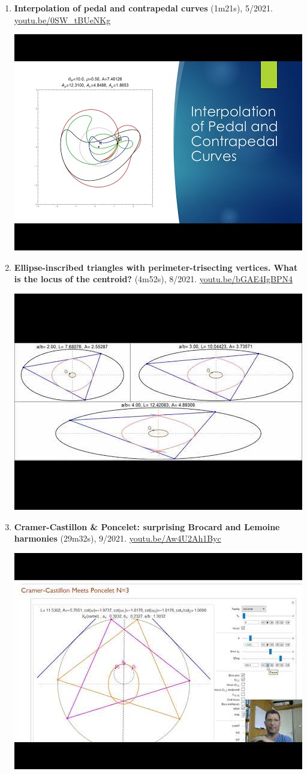 \documentclass[12pt]{article}
\begin{document}
\begin{enumerate}[resume]
% 
\item \textbf{Interpolation of pedal and contrapedal curves} (1m21s), 5/2021. \href{https://youtu.be/0SW_tBUeNKg}{\url{youtu.be/0SW\_tBUeNKg}}
\begin{center}\includegraphics[width=.5\textwidth]{pics/0SW_tBUeNKg.jpg}\end{center}
% 
\item \textbf{Ellipse-inscribed triangles with perimeter-trisecting vertices. What is the locus of the centroid?} (4m52s), 8/2021. \href{https://youtu.be/bGAE4IgBPN4}{\url{youtu.be/bGAE4IgBPN4}}
\begin{center}\includegraphics[width=.5\textwidth]{pics/bGAE4IgBPN4.jpg}\end{center}
% 
\item \textbf{Cramer-Castillon \& Poncelet: surprising Brocard and Lemoine harmonies} (29m32s), 9/2021. \href{https://youtu.be/Aw4U2Ah1Byc}{\url{youtu.be/Aw4U2Ah1Byc}}
\begin{center}\includegraphics[width=.5\textwidth]{pics/Aw4U2Ah1Byc.jpg}\end{center}

\end{enumerate}
\end{document}

